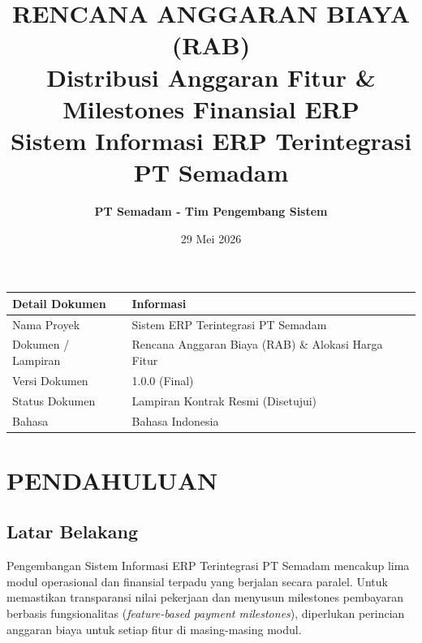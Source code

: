 \documentclass[11pt,a4paper]{article}
\title{
    \vspace{-1.5cm}
    \color{primarycolor}\textbf{\Huge RENCANA ANGGARAN BIAYA (RAB)}\\
    \vspace{0.3cm}
    \color{secondarycolor}\Large\textbf{Distribusi Anggaran Fitur \& Milestones Finansial ERP}\\
    \vspace{0.2cm}
    \large\textbf{Sistem Informasi ERP Terintegrasi PT Semadam}
}
\author{\textbf{PT Semadam - Tim Pengembang Sistem}}
\date{29 Mei 2026}
\begin{document}
\maketitle

\thispagestyle{empty}
\begin{center}
    \vspace{1.5cm}
    \begin{tabular}{ll}
        \toprule
        \textbf{Detail Dokumen} & \textbf{Informasi} \\
        \midrule
        Nama Proyek & Sistem ERP Terintegrasi PT Semadam \\
        Dokumen / Lampiran & Rencana Anggaran Biaya (RAB) \& Alokasi Harga Fitur \\
        Versi Dokumen & 1.0.0 (Final) \\
        Status Dokumen & Lampiran Kontrak Resmi (Disetujui) \\
        Bahasa & Bahasa Indonesia \\
        \bottomrule
    \end{tabular}
\end{center}

\newpage
\tableofcontents
\newpage

\section{PENDAHULUAN}

\subsection{Latar Belakang}
Pengembangan Sistem Informasi ERP Terintegrasi PT Semadam mencakup lima modul operasional dan finansial terpadu yang berjalan secara paralel. Untuk memastikan transparansi nilai pekerjaan dan menyusun milestones pembayaran berbasis fungsionalitas (\textit{feature-based payment milestones}), diperlukan perincian anggaran biaya untuk setiap fitur di masing-masing modul.
\end{document}
